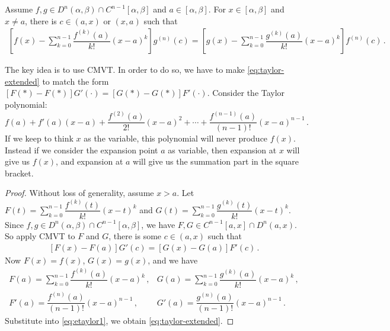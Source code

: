 \documentclass{article}
\begin{document}
\begin{theorem}
    Assume $ f, g \in D^{n} (\alpha, \beta) \cap C^{n - 1} [\alpha, \beta] $ and $ a \in [\alpha, \beta] $. For $ x \in [\alpha, \beta] $ and $ x \neq a $, there is $ c \in (a, x) \text { or } (x, a) $ such that
    \begin{align} \label{eq:taylor-extended}
        \left[ f(x) - \sum_{k=0}^{n-1} \dfrac{f^{(k)} (a)}{k!} (x - a)^k \right] g^{(n)}(c) = \left[ g(x) - \sum_{k=0}^{n-1} \dfrac{g^{(k)} (a)}{k!} (x - a)^k \right] f^{(n)}(c) \,. 
    \end{align}
\end{theorem}
The key idea is to use CMVT. In order to do so, we have to make \eqref{eq:taylor-extended} to match the form $ [F(*) - F(*)] G'(\cdot) = [G(*) - G(*)] F'(\cdot) $. Consider the Taylor polynomial:
\[
    f(a) + f'(a) (x - a) + \dfrac{f^{(2)}(a)}{2!} (x - a)^2 + \cdots + \dfrac{f^{(n-1)}(a)}{(n-1)!} (x - a)^{n-1} \,.
\]
If we keep to think $ x $ as the variable, this polynomial will never produce $ f(x) $. Instead if we consider the expansion point $ a $ as variable, then expansion at $ x $ will give us $ f(x) $, and expansion at $ a $ will give us the summation part in the square bracket.

\begin{proof}
    Without loss of generality, assume $ x > a $. Let $ \displaystyle F(t) = \sum_{k=0}^{n-1} \dfrac{f^{(k)} (t)}{k!} (x - t)^{k} $ and $ \displaystyle G(t) = \sum_{k=0}^{n-1} \dfrac{g^{(k)} (t)}{k!} (x - t)^{k} $. Since $ f, g \in D^{n} (\alpha, \beta) \cap C^{n - 1} [\alpha, \beta] $, we have $ F, G \in C^{n - 1} [a, x] \cap D^{n} (a, x) $. So apply CMVT to $ F $ and $ G $, there is some $ c \in (a, x) $ such that
    \begin{align} \label{eq:etaylor1}
        [F(x) - F(a)] G'(c) = [G(x) - G(a)] F'(c) \,. 
    \end{align}
    Now $ F(x) = f(x) $, $ G(x) = g(x) $, and we have
    \[ 
        \begin{array}{ll} \displaystyle
            F(a) = \sum_{k = 0}^{n-1} \dfrac{f^{(k)} (a)}{k!} (x - a)^k \,, &
            G(a) = \sum_{k = 0}^{n-1} \dfrac{g^{(k)} (a)}{k!} (x - a)^k \,,  \\[1.5em]
            F'(a) = \dfrac{f^{(n)}(a)}{(n - 1)!} (x - a)^{n - 1} \,,       &
            G'(a) = \dfrac{g^{(n)}(a)}{(n - 1)!} (x - a)^{n - 1} \,.
        \end{array}
    \]
    Substitute into \eqref{eq:etaylor1}, we obtain \eqref{eq:taylor-extended}.
\end{proof}
\end{document}
